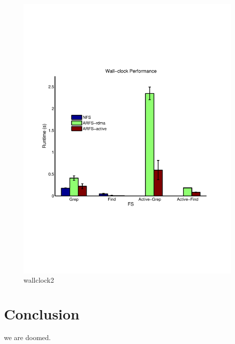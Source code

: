 \documentclass[10pt]{article}
\begin{document}
\begin{figure}
  \centering
\includegraphics[scale=0.5, trim = 0 200 0 200]{../../results/matlab/wallclock2.pdf}
  \caption{wallclock2}\label{wallclock2}
\end{figure}


\section{Conclusion}
we are doomed.


 
\end{document}
